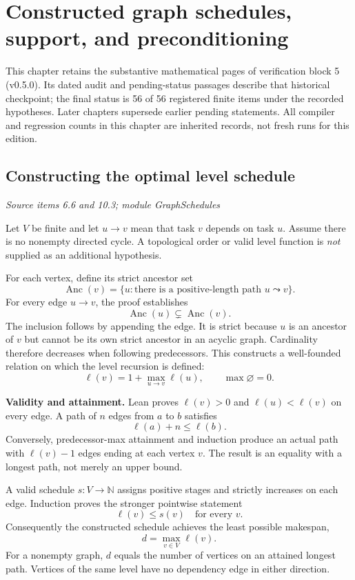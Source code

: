 \clearpage\FloatBarrier\section{Constructed graph schedules, support, and preconditioning}\label{supp5:section:001}
This chapter retains the substantive mathematical pages of verification block 5 (v0.5.0). Its dated audit and pending-status passages describe that historical checkpoint; the final status is 56 of 56 registered finite items under the recorded hypotheses. Later chapters supersede earlier pending statements. All compiler and regression counts in this chapter are inherited records, not fresh runs for this edition.\par

\subsection{Constructing the optimal level schedule}\label{supp5:subsection:001}\textit{Source items 6.6 and 10.3; module GraphSchedules}\par
Let $V$ be finite and let $u\to v$ mean that task $v$ depends on task $u$. Assume there is no nonempty directed cycle. A topological order or valid level function is \emph{not} supplied as an additional hypothesis.

For each vertex, define its strict ancestor set
\[
\operatorname{Anc}(v)=\{u:\text{there is a positive-length path }u\leadsto v\}.
\]
For every edge $u\to v$, the proof establishes
\[
\operatorname{Anc}(u)\subsetneq\operatorname{Anc}(v).
\]
The inclusion follows by appending the edge. It is strict because $u$ is an ancestor of $v$ but cannot be its own strict ancestor in an acyclic graph. Cardinality therefore decreases when following predecessors. This constructs a well-founded relation on which the level recursion is defined:
\[
\boxed{\ell(v)=1+\max_{u\to v}\ell(u),\qquad \max\varnothing=0.}
\]

\textbf{Validity and attainment.} Lean proves $\ell(v)>0$ and $\ell(u)<\ell(v)$ on every edge. A path of $n$ edges from $a$ to $b$ satisfies
\[
\ell(a)+n\leq\ell(b).
\]
Conversely, predecessor-max attainment and induction produce an actual path with $\ell(v)-1$ edges ending at each vertex $v$. The result is an equality with a longest path, not merely an upper bound.

A valid schedule $s:V\to\mathbb N$ assigns positive stages and strictly increases on each edge. Induction proves the stronger pointwise statement
\[
\ell(v)\leq s(v)\quad\text{for every }v.
\]
Consequently the constructed schedule achieves the least possible makespan,
\[
\boxed{d=\max_{v\in V}\ell(v).}
\]
For a nonempty graph, $d$ equals the number of vertices on an attained longest path. Vertices of the same level have no dependency edge in either direction.

